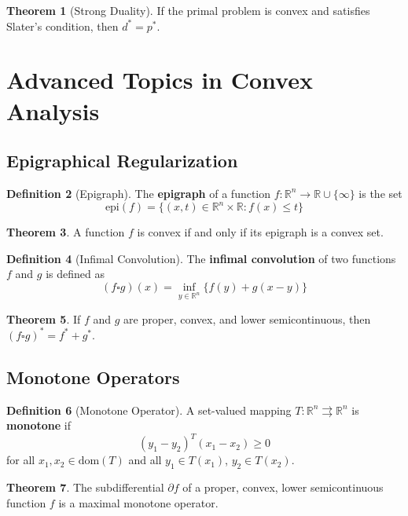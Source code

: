 \documentclass[12pt,a4paper]{article}
\theoremstyle{definition}
\newtheorem{theorem}{Theorem}[section]
\newtheorem{definition}[theorem]{Definition}
\begin{document}
\begin{theorem}[Strong Duality]
If the primal problem is convex and satisfies Slater's condition, then $d^* = p^*$.
\end{theorem}

\section{Advanced Topics in Convex Analysis}

\subsection{Epigraphical Regularization}

\begin{definition}[Epigraph]
The \textbf{epigraph} of a function $f: \mathbb{R}^n \to \mathbb{R} \cup \{\infty\}$ is the set
\[\text{epi}(f) = \{(x, t) \in \mathbb{R}^n \times \mathbb{R} : f(x) \leq t\}\]
\end{definition}

\begin{theorem}
A function $f$ is convex if and only if its epigraph is a convex set.
\end{theorem}

\begin{definition}[Infimal Convolution]
The \textbf{infimal convolution} of two functions $f$ and $g$ is defined as
\[(f \square g)(x) = \inf_{y \in \mathbb{R}^n} \{f(y) + g(x-y)\}\]
\end{definition}

\begin{theorem}
If $f$ and $g$ are proper, convex, and lower semicontinuous, then $(f \square g)^* = f^* + g^*$.
\end{theorem}

\subsection{Monotone Operators}

\begin{definition}[Monotone Operator]
A set-valued mapping $T: \mathbb{R}^n \rightrightarrows \mathbb{R}^n$ is \textbf{monotone} if
\[(y_1 - y_2)^T(x_1 - x_2) \geq 0\]
for all $x_1, x_2 \in \text{dom}(T)$ and all $y_1 \in T(x_1)$, $y_2 \in T(x_2)$.
\end{definition}

\begin{theorem}
The subdifferential $\partial f$ of a proper, convex, lower semicontinuous function $f$ is a maximal monotone operator.
\end{theorem}
\end{document}
